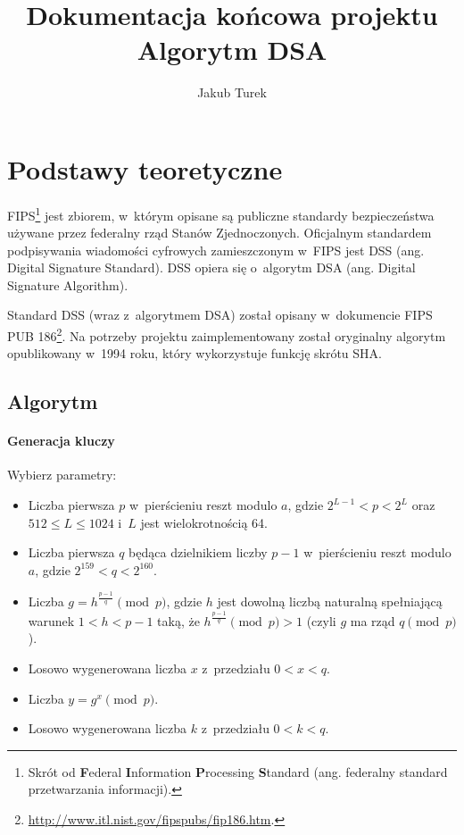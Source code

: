 \documentclass{article}
\title{Dokumentacja końcowa projektu \\ \Large{Algorytm DSA}}
\author{Jakub Turek}
\date{}
\begin{document}
    \maketitle

    \section*{Podstawy teoretyczne}
    
        FIPS\footnote{Skrót od \textbf{F}ederal \textbf{I}nformation \textbf{P}rocessing \textbf{S}tandard (ang. federalny standard przetwarzania informacji).} jest zbiorem, w~którym opisane są publiczne standardy bezpieczeństwa używane przez federalny rząd Stanów Zjednoczonych. Oficjalnym standardem podpisywania wiadomości cyfrowych zamieszczonym w~FIPS jest DSS (ang. Digital Signature Standard). DSS opiera się o~algorytm DSA (ang. Digital Signature Algorithm).
    
        Standard DSS (wraz z~algorytmem DSA) został opisany w~dokumencie FIPS PUB 186\footnote{\url{http://www.itl.nist.gov/fipspubs/fip186.htm}.}. Na potrzeby projektu zaimplementowany został oryginalny algorytm opublikowany w~1994 roku, który wykorzystuje funkcję skrótu SHA.
        
    \subsection*{Algorytm}
    
        \paragraph*{Generacja kluczy}
    
        Wybierz parametry:
            
        \begin{itemize}
            \item Liczba pierwsza $p$ w~pierścieniu reszt modulo $a$, gdzie $2^{L-1} < p < 2^{L}$ oraz $512 \leq L \leq 1024$ i~$L$ jest wielokrotnością 64.
            \item Liczba pierwsza $q$ będąca dzielnikiem liczby $p - 1$ w~pierścieniu reszt modulo $a$, gdzie $2^{159} < q < 2^{160}$.
            \item Liczba $g = h^{\frac{p-1}{q}} \pmod p$, gdzie $h$ jest dowolną liczbą naturalną spełniającą warunek $1 < h < p - 1$ taką, że $h^{\frac{p-1}{q}} \pmod p > 1$ (czyli $g$ ma rząd $q \pmod p$).
            \item Losowo wygenerowana liczba $x$ z~przedziału $0 < x < q$.
            \item Liczba $y = g^{x} \pmod p$.
            \item Losowo wygenerowana liczba $k$ z~przedziału $0 < k < q$.
        \end{itemize}
            
\end{document}

